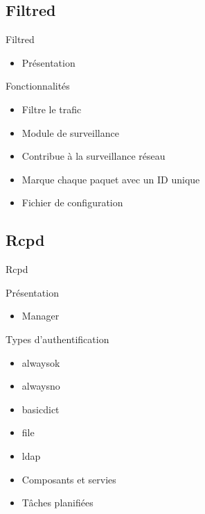 \documentclass[t,12pt]{beamer}
\begin{document}
	  \subsection{Filtred}
	  \begin{frame}{Filtred}                                                         %
	      \begin{itemize}                                                   %
		      \item Présentation
		      \end{itemize}
		\begin{block}{Fonctionnalités}
			\begin{itemize}
		    \item Filtre le trafic
		    \item Module de surveillance
		    \item Contribue à la surveillance réseau
		    \item Marque chaque paquet avec un ID unique
	    \end{itemize}
		\end{block}
  
    \begin{itemize}
		\item Fichier de configuration
	  \end{itemize}
	  \end{frame} 

	  \subsection{Rcpd}
	  \begin{frame}{Rcpd}                                                         %
		\begin{block}{Présentation}
		  \begin{itemize}
		    \item Manager
		    
	    \end{itemize}
		\end{block}
		
		\begin{block}{Types d'authentification}
		\begin{itemize}
		  \item alwaysok
      \item alwaysno
      \item basicdict
      \item file
      \item ldap
	  \end{itemize}
    \end{block}
    
    \begin{itemize}
	    \item Composants et servies
	    \item Tâches planifiées
	  \end{itemize}
	  \end{frame} 
\end{document}
